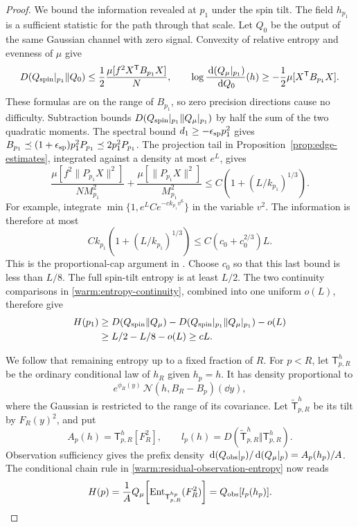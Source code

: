 \begin{proof}
We bound the information revealed at \(p_1\) under the spin tilt.  The
field \(h_{p_1}\) is a sufficient statistic for the path through that
scale.  Let \(Q_0\) be the output of the same Gaussian channel with
zero signal.  Convexity of relative entropy and evenness of \(\mu\)
give
\[
 D(Q_{\rm spin}|_{p_1}\Vert Q_0)
       \le\frac12\frac{\mu[f^2X^{\mathsf T}B_{p_1}X]}N,
 \qquad
 \log\frac{\,\mathrm d(Q_\mu|_{p_1})}{\,\mathrm d Q_0}(h)
       \ge-\frac12\mu[X^{\mathsf T}B_{p_1}X].
\]
These formulas are on the range of \(B_{p_1}\), so zero precision
directions cause no difficulty.  Subtraction bounds
\(D(Q_{\rm spin}|_{p_1}\Vert Q_\mu|_{p_1})\) by half the sum of the two
quadratic moments.  The spectral bound \(d_1\ge-\epsilon_{\rm sp}p_1^2\)
gives \(B_{p_1}\preceq(1+\epsilon_{\rm sp})p_1^2P_{p_1}
\preceq2p_1^2P_{p_1}\).  The projection
tail in Proposition~\ref{prop:edge-estimates}, integrated against a density at most
\(e^L\), gives
\[
 \frac{\mu[f^2\|P_{p_1}X\|^2]}{NM_{p_1}^2}
       +\frac{\mu[\|P_{p_1}X\|^2]}{M_{p_1}^2}
 \le C\left(1+(L/k_{p_1})^{1/3}\right).
\]
For example, integrate
\(\min\{1,e^LCe^{-c k_{p_1}v^6}\}\) in the variable \(v^2\).
The information is therefore at most
\[
 Ck_{p_1}\left(1+(L/k_{p_1})^{1/3}\right)
   \le C(c_0+c_0^{2/3})L .
\]
This is the proportional-cap argument in
\cite[Equation~(19.12)]{CM}.  Choose \(c_0\) so that this last bound is
less than \(L/8\).  The full spin-tilt entropy is at least \(L/2\).
The two continuity comparisons in \eqref{warm:entropy-continuity},
combined into one uniform \(o(L)\), therefore give
\begin{equation}\label{warm:residual-lower}
 \begin{split}
 H(p_1)&\ge D(Q_{\rm spin}\Vert Q_\mu)
       -D(Q_{\rm spin}|_{p_1}\Vert Q_\mu|_{p_1})-o(L)\\
       &\ge L/2-L/8-o(L)\ge cL.
 \end{split}
\end{equation}

We follow that remaining entropy up to a fixed fraction of \(R\).
For \(p<R\), let \(\mathsf T_{p,R}^h\) be the ordinary conditional
law of \(h_R\) given \(h_p=h\).  It has density proportional to
\[
 e^{\phi_R(y)}\,\mathcal N(h,B_R-B_p)(\dd y),
\]
where the Gaussian is restricted to the range of its covariance.
Let \(\widetilde{\mathsf T}_{p,R}^h\) be its tilt by \(F_R(y)^2\), and
put
\[
 A_p(h)=\mathsf T_{p,R}^h[F_R^2],\qquad
 l_p(h)=D(\widetilde{\mathsf T}_{p,R}^h\Vert\mathsf T_{p,R}^h).
\]
Observation sufficiency gives the prefix density
\(\,\mathrm d(Q_{\rm obs}|_p)/\,\mathrm d(Q_\mu|_p)=A_p(h_p)/A\).  The conditional
chain rule in \eqref{warm:residual-observation-entropy} now reads
\begin{equation}\label{warm:residual-transition-entropy}
 H(p)=\frac1A Q_\mu\!\left[
       \operatorname{Ent}_{\mathsf T_{p,R}^{h_p}}(F_R^2)\right]
       =Q_{\rm obs}[l_p(h_p)].
\end{equation}


\end{proof}
